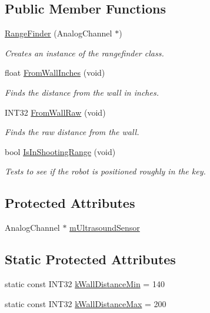\subsection*{\-Public \-Member \-Functions}
\begin{DoxyCompactItemize}
\item 
\hyperlink{class_range_finder_ae99eb35a21af3961b606cff3b61253d5}{\-Range\-Finder} (\-Analog\-Channel $\ast$)
\begin{DoxyCompactList}\small\item\em \-Creates an instance of the rangefinder class. \end{DoxyCompactList}\item 
float \hyperlink{class_range_finder_a99084a15d47c494a2728da871953c499}{\-From\-Wall\-Inches} (void)
\begin{DoxyCompactList}\small\item\em \-Finds the distance from the wall in inches. \end{DoxyCompactList}\item 
\-I\-N\-T32 \hyperlink{class_range_finder_a5e851606cc6cbab25759a170c8f9f726}{\-From\-Wall\-Raw} (void)
\begin{DoxyCompactList}\small\item\em \-Finds the raw distance from the wall. \end{DoxyCompactList}\item 
bool \hyperlink{class_range_finder_adbf73207e68b627c19bcbf1e53632928}{\-Is\-In\-Shooting\-Range} (void)
\begin{DoxyCompactList}\small\item\em \-Tests to see if the robot is positioned roughly in the key. \end{DoxyCompactList}\end{DoxyCompactItemize}
\subsection*{\-Protected \-Attributes}
\begin{DoxyCompactItemize}
\item 
\-Analog\-Channel $\ast$ \hyperlink{class_range_finder_ac2d9d3c890c0997830f28d39c135b5d5}{m\-Ultrasound\-Sensor}
\end{DoxyCompactItemize}
\subsection*{\-Static \-Protected \-Attributes}
\begin{DoxyCompactItemize}
\item 
static const \-I\-N\-T32 \hyperlink{class_range_finder_aede996e16ed0cfafc6013e12aabdf03a}{k\-Wall\-Distance\-Min} = 140
\item 
static const \-I\-N\-T32 \hyperlink{class_range_finder_aa95ad17f79c12890881b881339bf9768}{k\-Wall\-Distance\-Max} = 200
\end{DoxyCompactItemize}


